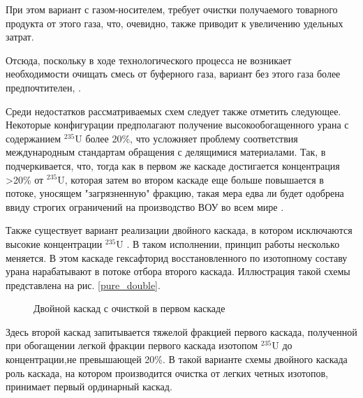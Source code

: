 При этом вариант с газом-носителем, требует очистки получаемого товарного продукта от этого газа, что, очевидно, также приводит к увеличению удельных затрат.

Отсюда, поскольку в ходе технологического процесса не возникает необходимости очищать смесь от буферного газа, вариант без этого газа более предпочтителен, \cite{smirnovKaskadnyeShemyZadachah2012}.

Среди недостатков рассматриваемых схем следует также отметить следующее.
Некоторые конфигурации предполагают получение высокообогащенного урана с содержанием $^{235}$U более 20\%, что усложняет проблему соответствия международным стандартам обращения с делящимися материалами.
Так, в \cite{palkinPurificationReprocessedUranium2016} подчеркивается, что, тогда как в первом же каскаде достигается концентрация >20\% от $^{235}$U, которая затем во втором каскаде еще больше повышается в потоке, уносящем "загрязненную" фракцию, такая мера едва ли будет одобрена ввиду строгих ограничений на производство ВОУ во всем мире \cite{ManagementHighEnriched2005}.

Также существует вариант реализации двойного каскада, в котором исключаются высокие концентрации $^{235}$U \cite{SposobIzotopnogoVosstanovleniya}.
В таком исполнении, принцип работы несколько меняется.
В этом каскаде гексафторид восстановленного по изотопному составу урана нарабатывают в потоке отбора второго каскада.
Иллюстрация такой схемы представлена на рис. \ref{pure_double}.
\begin{figure}[ht]
  \caption{Двойной каскад с очисткой в первом каскаде}\label{fig:pure_double}
\end{figure}
Здесь второй каскад запитывается тяжелой фракцией первого каскада, полученной при обогащении легкой фракции первого каскада изотопом $^{235}$U до концентрации,не превышающей 20\%.
В такой варианте схемы двойного каскада роль каскада, на котором производится очистка от легких четных изотопов, принимает первый ординарный каскад.

